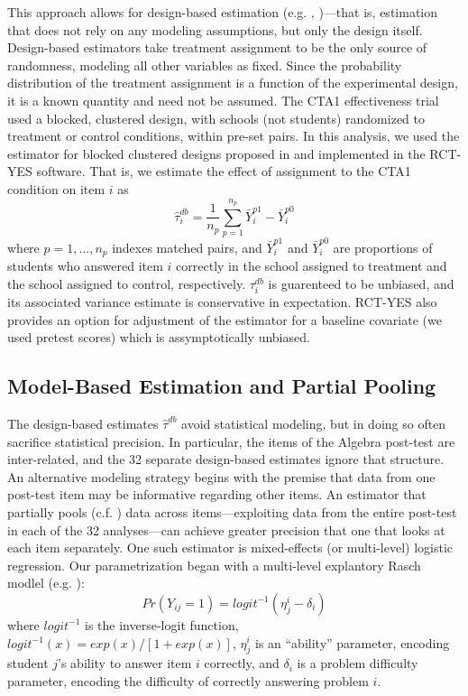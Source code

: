 \documentclass{edm_template}
\begin{document}
This approach allows for design-based estimation
(e.g. \cite{dunning2010design}, \cite{freedman2008regression})---that is, estimation
that does not rely on any modeling assumptions, but only the design
itself.
Design-based estimators take treatment assignment to be the only
source of randomness, modeling all other variables as fixed.
Since the probability distribution of the treatment assignment is a function of
the experimental design, it is a known quantity and need not be
assumed.
The CTA1 effectiveness trial used a blocked, clustered design, with
schools (not students) randomized to treatment or control conditions,
within pre-set pairs.
In this analysis, we used the estimator for blocked clustered designs
proposed in \cite{schochet2015statistical} and implemented in the
RCT-YES software.
That is, we estimate the effect of assignment to the CTA1 condition on
item $i$ as
\begin{equation}
\hat{\tau}_i^{db}=\frac{1}{n_p}\displaystyle\sum_{p=1}^{n_p}
\bar{Y}_i^{p1}-\bar{Y}_i^{p0}
\end{equation}
where $p=1,\dots,n_p$ indexes matched pairs, and $\bar{Y}_i^{p1}$ and
$\bar{Y}_i^{p0}$ are proportions of students who answered item $i$
correctly in the school assigned to treatment and the school assigned
to control, respectively.
$\tau_i^{db}$ is guarenteed to be unbiased, and its associated
variance estimate is conservative in expectation.
RCT-YES also provides an option for adjustment of the estimator for a
baseline covariate (we used pretest scores) which is assymptotically
unbiased.

\subsection{Model-Based Estimation and Partial Pooling}

The design-based estimates $\hat{\tau}^{db}$ avoid statistical
modeling, but in doing so often sacrifice statistical precision.
In particular, the items of the Algebra post-test are inter-related,
and the 32 separate design-based estimates ignore that structure.
An alternative modeling strategy begins with the premise that data
from one post-test item may be informative regarding other items.
An estimator that partially pools (c.f. \cite{gelmanHill}) data across
items---exploiting data from the entire post-test in each of the 32
analyses---can achieve greater precision that one that looks at each
item separately.
One such estimator is mixed-effects (or multi-level) logistic
regression.
Our parametrization began with a multi-level explantory Rasch modlel
(e.g. \cite{explantoryIRT}):
\begin{equation}\label{eq:rasch2}
Pr(Y_{ij}=1)=logit^{-1}(\eta^i_j-\delta_i)
\end{equation}
where $logit^{-1}$ is the inverse-logit function,
$logit^{-1}(x)=exp(x)/[1+exp(x)]$, $\eta^i_j$ is an ``ability''
parameter, encoding student $j$'s ability to answer item $i$
correctly, and $\delta_i$ is a problem difficulty parameter, encoding
the difficulty of correctly answering problem $i$.
\end{document}

